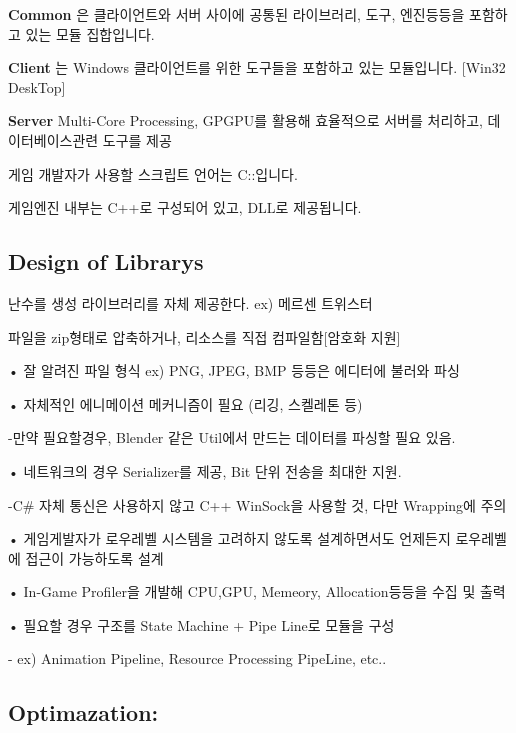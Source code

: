 {\bfseries Common} 은 클라이언트와 서버 사이에 공통된 라이브러리, 도구, 엔진등등을 포함하고 있는 모듈 집합입니다.

{\bfseries Client} 는 Windows 클라이언트를 위한 도구들을 포함하고 있는 모듈입니다. \mbox{[}Win32 Desk\+Top\mbox{]}

{\bfseries Server} Multi-\/\+Core Processing, G\+P\+G\+P\+U를 활용해 효율적으로 서버를 처리하고, 데이터베이스관련 도구를 제공

게임 개발자가 사용할 스크립트 언어는 C\+::입니다.

게임엔진 내부는 C++로 구성되어 있고, D\+L\+L로 제공됩니다.

\subsection*{Design of Librarys}

난수를 생성 라이브러리를 자체 제공한다. ex) 메르센 트위스터

파일을 zip형태로 압축하거나, 리소스를 직접 컴파일함\mbox{[}암호화 지원\mbox{]}

• 잘 알려진 파일 형식 ex) P\+NG, J\+P\+EG, B\+MP 등등은 에디터에 불러와 파싱

• 자체적인 에니메이션 메커니즘이 필요 (리깅, 스켈레톤 등) \begin{DoxyVerb}-만약 필요할경우, Blender 같은 Util에서 만드는 데이터를 파싱할 필요 있음.
\end{DoxyVerb}


• 네트워크의 경우 Serializer를 제공, Bit 단위 전송을 최대한 지원. \begin{DoxyVerb} -C# 자체 통신은 사용하지 않고 C++ WinSock을 사용할 것, 다만 Wrapping에 주의
\end{DoxyVerb}


• 게임게발자가 로우레벨 시스템을 고려하지 않도록 설계하면서도 언제든지 로우레벨에 접근이 가능하도록 설계

• In-\/\+Game Profiler을 개발해 C\+PU,G\+PU, Memeory, Allocation등등을 수집 및 출력

• 필요할 경우 구조를 State Machine + Pipe Line로 모듈을 구성 \begin{DoxyVerb}    - ex) Animation Pipeline, Resource Processing PipeLine, etc..
\end{DoxyVerb}


\subsection*{Optimazation\+:}

